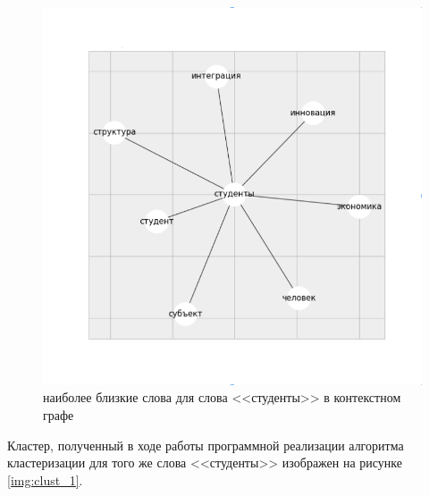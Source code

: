 \begin{figure}[ht]
  \begin{minipage}[ht]{1.0\linewidth}\centering
    \includegraphics[width=1.0\linewidth]{Dissertation/pics/students_sim}
    \caption{наиболее близкие слова для слова <<студенты>> в контекстном графе}
    \label{img:sim_2_clust}
  \end{minipage}
\end{figure}

Кластер, полученный в ходе работы программной реализации алгоритма кластеризации для того же слова <<студенты>> изображен на рисунке \ref{img:clust_1}.

